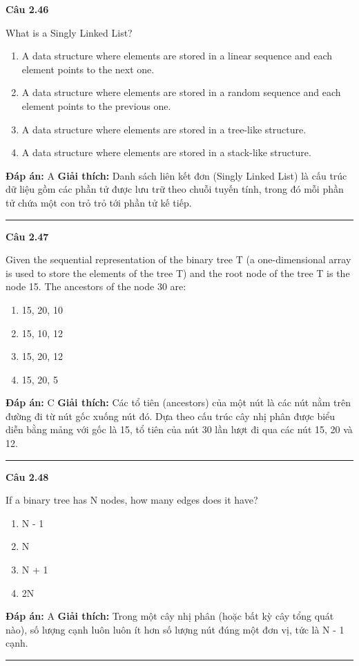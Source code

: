 \documentclass[11pt,a4paper]{article}
\newenvironment{question}[1]{%
  \par\vspace{1em}\noindent\textbf{\large Câu #1}\par\vspace{0.4em}
}{%
  \par\vspace{1em}\hrule\vspace{0.6em}
}
\newenvironment{choices}{%
  \begin{enumerate}[label=\textbf{\Alph*.},leftmargin=2.2em,itemsep=2pt,topsep=3pt]
}{%
  \end{enumerate}
}
\newcommand{\choice}{\item}
\begin{document}
\begin{question}{2.46}
What is a Singly Linked List?
\begin{choices}
\choice A data structure where elements are stored in a linear sequence and each element points to the next one.
\choice A data structure where elements are stored in a random sequence and each element points to the previous one.
\choice A data structure where elements are stored in a tree-like structure.
\choice A data structure where elements are stored in a stack-like structure.
\end{choices}
\textbf{Đáp án:} A
\textbf{Giải thích:} Danh sách liên kết đơn (Singly Linked List) là cấu trúc dữ liệu gồm các phần tử được lưu trữ theo chuỗi tuyến tính, trong đó mỗi phần tử chứa một con trỏ trỏ tới phần tử kế tiếp.
\end{question}

\begin{question}{2.47}
Given the sequential representation of the binary tree T (a one-dimensional array is used to store the elements of the tree T) and the root node of the tree T is the node 15. The ancestors of the node 30 are:
\begin{choices}
\choice 15, 20, 10
\choice 15, 10, 12
\choice 15, 20, 12
\choice 15, 20, 5
\end{choices}
\textbf{Đáp án:} C
\textbf{Giải thích:} Các tổ tiên (ancestors) của một nút là các nút nằm trên đường đi từ nút gốc xuống nút đó. Dựa theo cấu trúc cây nhị phân được biểu diễn bằng mảng với gốc là 15, tổ tiên của nút 30 lần lượt đi qua các nút 15, 20 và 12.
\end{question}

\begin{question}{2.48}
If a binary tree has N nodes, how many edges does it have?
\begin{choices}
\choice N - 1
\choice N
\choice N + 1
\choice 2N
\end{choices}
\textbf{Đáp án:} A
\textbf{Giải thích:} Trong một cây nhị phân (hoặc bất kỳ cây tổng quát nào), số lượng cạnh luôn luôn ít hơn số lượng nút đúng một đơn vị, tức là N - 1 cạnh.
\end{question}
\end{document}
